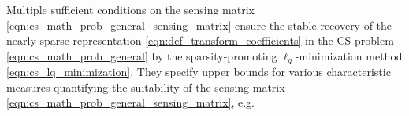 Multiple sufficient conditions on
the sensing matrix
\eqref{eqn:cs_math_prob_general_sensing_matrix} ensure
the stable recovery of
the nearly-sparse representation
\eqref{eqn:def_transform_coefficients} in
the \ac{CS} problem
\eqref{eqn:cs_math_prob_general} by
the sparsity-promoting $\ell_{q}$-minimization method
\eqref{eqn:cs_lq_minimization}.
They specify
upper bounds for
various characteristic measures quantifying
the suitability of
the sensing matrix
\eqref{eqn:cs_math_prob_general_sensing_matrix}, e.g.
